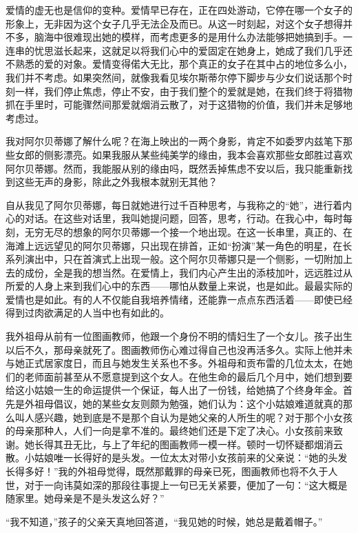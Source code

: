 \par 爱情的虚无也是信仰的变种。爱情早已存在，正在四处游动，它停在哪一个女子的形象上，无非因为这个女子几乎无法企及而已。从这一时刻起，对这个女子想得并不多，脑海中很难现出她的模样，而考虑更多的是用什么办法能够把她搞到手。一连串的忧思滋长起来，这就足以将我们心中的爱固定在她身上，她成了我们几乎还不熟悉的爱的对象。爱情变得偌大无比，那个真正的女子在其中占的地位多么小，我们并不考虑。如果突然间，就像我看见埃尔斯蒂尔停下脚步与少女们说话那个时刻一样，我们停止焦虑，停止不安，由于我们整个的爱就是她，在我们终于将猎物抓在手里时，可能骤然间那爱就烟消云散了，对于这猎物的价值，我们并未足够地考虑过。
\par 我对阿尔贝蒂娜了解什么呢？在海上映出的一两个身影，肯定不如委罗内兹笔下那些女郎的侧影漂亮。如果我服从某些纯美学的缘由，我本会喜欢那些女郎胜过喜欢阿尔贝蒂娜。然而，我能服从别的缘由吗，既然丢掉焦虑不安以后，我只能重新找到这些无声的身影，除此之外我根本就别无其他？
\par 自从我见了阿尔贝蒂娜，每日就她进行过千百种思考，与我称之的“她”，进行着内心的对话。在这些对话里，我叫她提问题，回答，思考，行动。在我心中，每时每刻，无穷无尽的想象的阿尔贝蒂娜一个接一个地出现。在这一长串里，真正的、在海滩上远远望见的阿尔贝蒂娜，只出现在排首，正如“扮演”某一角色的明星，在长系列演出中，只在首演式上出现一般。这个阿尔贝蒂娜只是一个侧影，一切附加上去的成份，全是我的想当然。在爱情上，我们内心产生出的添枝加叶，远远胜过从所爱的人身上来到我们心中的东西——哪怕从数量上来说，也是如此。最最实际的爱情也是如此。有的人不仅能自我培养情绪，还能靠一点点东西活着——即使已经得到过肉欲满足的人当中也有如此的。
\par 我外祖母从前有一位图画教师，他跟一个身份不明的情妇生了一个女儿。孩子出生以后不久，那母亲就死了。图画教师伤心难过得自己也没再活多久。实际上他并未与她正式居家度日，而且与她发生关系也不多。外祖母和贡布雷的几位太太，在她们的老师面前甚至从不愿意提到这个女人。在他生命的最后几个月中，她们想到要给这小姑娘一生的命运提供一个保证，每人出了一份钱，给她搞了个终身年金。首先是外祖母倡议，她的某些女友则颇为勉强，她们认为：这个小姑娘难道就真的那么叫人感兴趣，她到底是不是那个自认为是她父亲的人所生的呢？对于那个小女孩的母亲那种人，人们一向是拿不准的。最终她们还是下定了决心。小女孩前来致谢。她长得其丑无比，与上了年纪的图画教师一模一样。顿时一切怀疑都烟消云散。小姑娘唯一长得好的是头发。一位太太对带小女孩前来的父亲说：“她的头发长得多好！”我的外祖母觉得，既然那戴罪的母亲已死，图画教师也将不久于人世，对于一向讳莫如深的那段往事提上一句已无关紧要，便加了一句：“这大概是随家里。她母亲是不是头发这么好？”
\par “我不知道，”孩子的父亲天真地回答道，“我见她的时候，她总是戴着帽子。”
